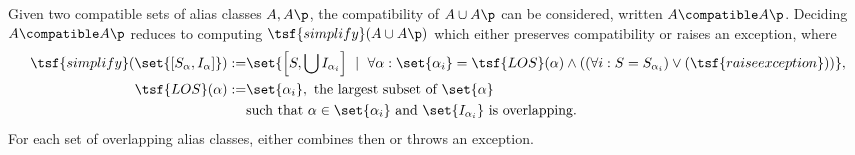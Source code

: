 \noindent
Given two compatible sets of alias classes $A, A\p$, the compatibility of $A \cup A\p$ can be considered, written $A \compatible A\p$. Deciding $A \compatible A\p$ reduces to computing $\tsf{simplify}(A \cup A\p)$ which either preserves compatibility or raises an exception, where
\begin{align*}
\tsf{simplify}(\set{ [S_\alpha, I_\alpha] })
:= &
\set{
  \left[ S, \bigcup I_{\alpha_i} \right]
  \ \mid \
  \forall \alpha :
  \set{ \alpha_i } = \tsf{LOS}(\alpha)
  \land
  ((\forall i : S = S_{\alpha_i}) \lor (\tsf{raise exception}))
},
\\
\tsf{LOS}(\alpha)
:= &
\set{ \alpha_i }, \
\text{the largest subset of} \ \set{ \alpha } \\&
\text{such that} \ \alpha \in \set{ \alpha_i } \
\text{and} \ \set{ I_{\alpha_i} } \ \text{is overlapping}.
\end{align*}
For each set of overlapping alias classes,  either combines then or throws an exception.

\newpage
